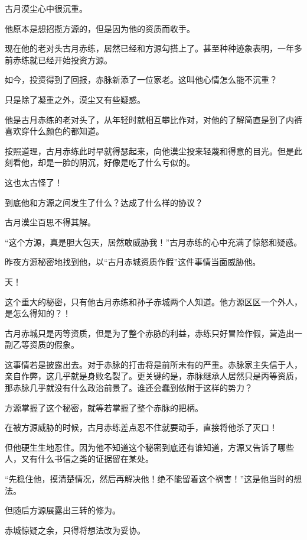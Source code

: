 
\begin{this_body}



古月漠尘心中很沉重。

他原本是想招揽方源的，但是因为他的资质而收手。

现在他的老对头古月赤练，居然已经和方源勾搭上了。甚至种种迹象表明，一年多前赤练就已经开始投资方源。

如今，投资得到了回报，赤脉新添了一位家老。这叫他心情怎么能不沉重？

只是除了凝重之外，漠尘又有些疑惑。

他是古月赤练的老对头了，从年轻时就相互攀比作对，对他的了解简直是到了内裤喜欢穿什么颜色的都知道。

按照道理，古月赤练此时早就得瑟起来，向他漠尘投来轻蔑和得意的目光。但是此刻看他，却是一脸的阴沉，好像是吃了什么亏似的。

这也太古怪了！

到底他和方源之间发生了什么？达成了什么样的协议？

古月漠尘百思不得其解。

“这个方源，真是胆大包天，居然敢威胁我！”古月赤练的心中充满了惊怒和疑惑。

昨夜方源秘密地找到他，以“古月赤城资质作假”这件事情当面威胁他。

天！

这个重大的秘密，只有他古月赤练和孙子赤城两个人知道。他方源区区一个外人，是怎么得知的？！

古月赤城只是丙等资质，但是为了整个赤脉的利益，赤练只好冒险作假，营造出一副乙等资质的假象。

这事情若是披露出去。对于赤脉的打击将是前所未有的严重。赤脉家主失信于人，亲自作弊，这几乎就是身败名裂了。更关键的是，赤脉继承人居然只是丙等资质，那赤脉几乎就没有什么政治前景了。谁还会蠢到依附于这样的势力？

方源掌握了这个秘密，就等若掌握了整个赤脉的把柄。

在被方源威胁的时候，古月赤练差点忍不住就要动手，直接将他杀了灭口！

但他硬生生地忍住。因为他不知道这个秘密到底还有谁知道，方源又告诉了哪些人，又有什么书信之类的证据留在某处。

“先稳住他，摸清楚情况，然后再解决他！绝不能留着这个祸害！”这是他当时的想法。

但随后方源展露出三转的修为。

赤城惊疑之余，只得将想法改为妥协。


\end{this_body}
